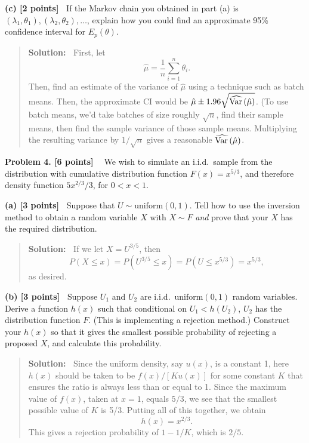 \documentclass{article}
\newcommand{\svskip}{\vspace{.2in}}
\newcommand{\lvskip}{\vspace{.5in}}
\def\Var{\mathop{\rm Var\,}\nolimits}
\begin{document}
\svskip
{\bf(c) [2 points]\ }
If the Markov chain you obtained in part (a) is $(\lambda_1, \theta_1),
(\lambda_2, \theta_2), \ldots$,
explain how you could find an approximate 95\% confidence interval 
for $E_p(\theta)$.
\begin{quotation}{\bf Solution:\ }
First, let 
\[
\hat\mu=\frac1n\sum_{i=1}^n \theta_i.
\]
Then, find an estimate of the variance of $\hat\mu$ using a technique such as batch means.
Then, the approximate CI  would be $\hat\mu \pm 1.96\sqrt{\widehat{\Var}(\hat\mu)}$.
(To use batch means, we'd take batches of size roughly $\sqrt n$, find their sample means,
then find the sample variance of those sample means.  Multiplying the resulting variance
by $1/\sqrt n$ gives a reasonable $\widehat{\Var}(\hat\mu)$.
\end{quotation}

\lvskip
{\bf Problem 4. [6 points] \ }
We wish to simulate an i.i.d.~sample from the distribution with
cumulative distribution function $F(x) = x^{5/3}$, and therefore
density function $5x^{2/3}/3$, for $0<x<1$.

\svskip
{\bf(a) [3 points]\ }
Suppose that $U\sim\mbox{uniform}(0,1)$.  Tell how to use the inversion method
to obtain a random variable $X$ with $X\sim F$ {\em and} prove that
your $X$ has the required distribution.
\begin{quotation}{\bf Solution:\ }
If we let $X=U^{3/5}$, then 
\[
P(X\le x) = P(U^{3/5}\le x) = P(U \le x^{5/3}) = x^{5/3},
\]
as desired.
\end{quotation}

\svskip
{\bf(b) [3 points]\ }
Suppose $U_1$ and $U_2$ are i.i.d.~$\mbox{uniform}(0,1)$ random variables.
Derive a function $h(x)$ such that conditional on $U_1<h(U_2)$,
$U_2$ has the distribution function $F$.  (This is implementing a rejection method.)
Construct your $h(x)$ so that it gives the smallest possible probability of rejecting
a proposed $X$, and calculate this probability.
\begin{quotation}{\bf Solution:\ }
Since the uniform density, say $u(x)$, is a constant 1, 
here $h(x)$ should be taken to be $f(x)/[Ku(x)]$ for some 
constant $K$ that ensures the ratio is always 
less than or equal to 1.  Since the maximum value of $f(x)$, taken at $x=1$, equals $5/3$, we
see that the smallest possible value of $K$ is 5/3.  Putting all of this together, we obtain
\[
h(x) = x^{2/3}.
\]
This gives a rejection probability of $1-1/K$, which is $2/5$.
\end{quotation}
\end{document}
